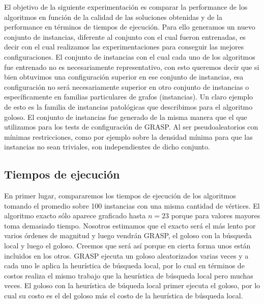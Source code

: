 El objetivo de la siguiente experimentación es comparar la performance de los algoritmos en función de la calidad de las soluciones obtenidas y de la performance en términos de tiempos de ejecución. Para ello
generamos un nuevo conjunto de instancias, diferente al conjunto con el cual fueron entrenadas, es decir
con el cual realizamos las experimentaciones para conseguir las mejores configuraciones. El conjunto de
instancias con el cual cada uno de los algoritmos fue entrenado no es necesariamente representativo, con
esto queremos decir que si bien obtuvimos una configuración superior en ese conjunto de instancias, esa
configuración no será necesariamente superior en otro conjunto de instancias o específicamente en 
familias particulares de grafos (instancias). Un claro ejemplo de esto es la familia de instancias
patológicas que describimos para el algoritmo goloso.
El conjunto de instancias fue generado de la misma manera que el que utilizamos para los tests de configuración
de GRASP. Al ser pseudoaleatorios con mínimas restricciones, como por ejemplo sobre la densidad mínima para que
las instancias no sean triviales, son independientes de dicho conjunto.

\subsection{Tiempos de ejecución}
En primer lugar, compararemos los tiempos de ejecución de los algoritmos tomando el promedio
sobre 100 instancias con una misma cantidad de vértices. El algoritmo exacto sólo
aparece graficado hasta $n=23$ porque para valores mayores toma demasiado tiempo.
Nosotros estimamos que el exacto será el más lento por varios órdenes de magnitud y luego
vendrán GRASP, el goloso con la búsqueda local y luego el goloso. Creemos que será así
porque en cierta forma unos están incluidos en los otros. GRASP ejecuta un goloso aleatorizados
varias veces y a cada uno le aplica la heurística de búsqueda local, por lo cual en términos
de costos realiza el mismo trabajo que la heurística de búsqueda local pero muchas veces.
El goloso con la heurística de búqueda local primer ejecuta el goloso, por lo cual su costo
es el del goloso más el costo de la heurística de búsqueda local.

